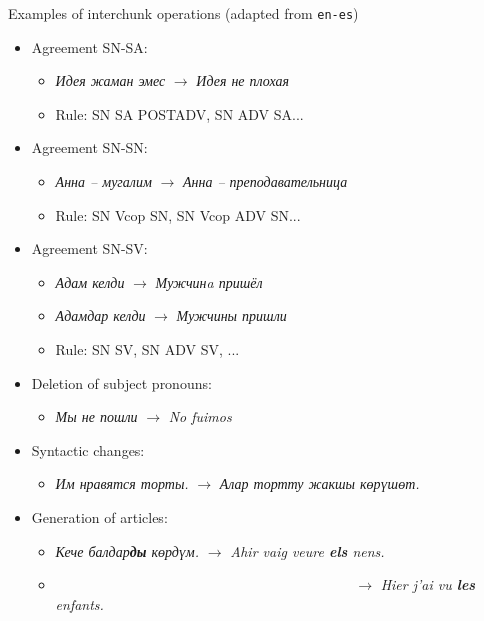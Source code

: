 \documentclass[10pt,xetex]{beamer} %
\begin{document}
\begin{frame}

\begin{exampleblock}{Examples of interchunk operations (adapted from \texttt{en-es})}
{\smallersans
\begin{itemize}
  \item Agreement SN-SA:
  \begin{itemize}
    \item \emph{Идея жаман эмес} $\rightarrow$ \emph{Идея не плохая}
    \item Rule: SN SA POSTADV, SN ADV SA...
  \end{itemize}
  \item Agreement SN-SN:
  \begin{itemize}
    \item \emph{Анна -- мугалим} $\rightarrow$ \emph{Анна -- преподавательница}
    \item Rule: SN Vcop SN, SN Vcop ADV SN...
   \end{itemize}
   \item Agreement SN-SV:
   \begin{itemize}
     \item \emph{Адам келди} $\rightarrow$ \emph{Мужчинa пришёл}
     \item \emph{Адамдар келди} $\rightarrow$ \emph{Мужчины пришли}
     \item Rule: SN SV, SN ADV SV, ...
    \end{itemize}
   \item Deletion of subject pronouns:
   \begin{itemize}
      \item \emph{Мы не пошли} $\rightarrow$ \emph{No fuimos}
    \end{itemize}
    \item Syntactic changes:
    \begin{itemize}
       \item \emph{Им нравятся торты.} $\rightarrow$ \emph{Алар тортту жакшы көрүшөт.}
    \end{itemize}
    \item Generation of articles:
    \begin{itemize}
      \item \emph{Кече балдар\textbf{ды} көрдүм.} $\rightarrow$ \emph{Ahir vaig veure \textbf{els} nens.}
      \item ~~~~~~~~~~~~~~~~~~~~~~~~~~~~~~~~~~~~~~~~~~ $\rightarrow$ \emph{Hier j'ai vu \textbf{les} enfants.}
    \end{itemize}
\end{itemize}
}


\end{exampleblock}

\end{frame}
\end{document}
